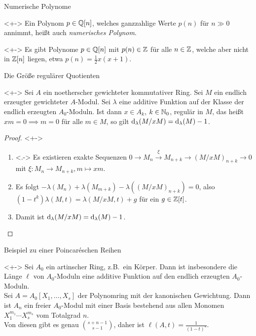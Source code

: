 \begin{frame}{Numerische Polynome}
	\begin{remark}<+->
		Ein Polynom \(p \in \mathbb Q[n]\), welches ganzzahlige Werte \(p(n)\) für
		\(n \gg 0\) annimmt, heißt auch \emph{numerisches Polynom}.
	\end{remark}
	\begin{example}<+->
		Es gibt Polynome \(p \in \mathbb Q[n]\) mit \(p(n) \in \mathbb Z\) für alle
		\(n \in \mathbb Z\), welche aber nicht in \(\mathbb Z[n]\) liegen, etwa
		\(p(n) = \frac 1 2 x(x + 1)\).
	\end{example}
\end{frame}

\begin{frame}{Die Größe regulärer Quotienten}
	\begin{proposition}<+->
		Sei \(A\) ein noetherscher gewichteter kommutativer Ring. Sei
		\(M\) ein endlich erzeugter gewichteter \(A\)-Modul. Sei \(\lambda\) eine additive
		Funktion auf der Klasse der endlich erzeugten \(A_0\)-Moduln. Ist dann
		\(x \in A_k\), \(k \in \mathbb N_0\), regulär in \(M\), das heißt
		\(x m = 0 \implies m = 0\) für alle \(m \in M\), so gilt
		\(\operatorname{d}_\lambda(M/x M) = \operatorname{d}_\lambda(M) - 1\).
	\end{proposition}
	\begin{proof}<+->
		\begin{enumerate}[<+->]
		\item<.->
			Es existieren exakte Sequenzen \(0 \to M_n \xrightarrow{\xi} 
			M_{n + k} \to (M/x M)_{n + k} \to 0\) mit \(\xi\colon M_n \to M_{n + k},
			m \mapsto x m\).
		\item
			Es folgt \(- \lambda(M_n) + \lambda(M_{m + k}) - \lambda((M/xM)_{n + k}) = 0\),
			also \((1 - t^k) \lambda(M, t) = \lambda(M/xM, t) + g\) für ein \(g \in \mathbb Z[t]\).
		\item
			Damit ist \(\operatorname{d}_\lambda(M/x M) = \operatorname{d}_\lambda(M) - 1\).
			\qedhere
		\end{enumerate}
	\end{proof}
\end{frame}

\begin{frame}{Beispiel zu einer Poincaréschen Reihen}
	\begin{example}<+->
		Sei \(A_0\) ein artinscher Ring, z.B.\ ein Körper. Dann ist insbesondere die Länge \(\ell\) von
		\(A_0\)-Moduln eine additive Funktion auf den endlich erzeugten \(A_0\)-Moduln.
		\\
		Sei \(A = A_0 [X_1, \dotsc, X_s]\) der Polynomring mit der kanonischen Gewichtung.
		Dann ist \(A_n\) ein freier \(A_0\)-Modul mit einer Basis bestehend
		aus allen Monomen \(X_1^{m_1} \dotsm X_s^{m_s}\) vom Totalgrad \(n\).
		\\
		Von diesen gibt es genau \(\binom{s + n - 1}{s - 1}\), daher ist
		\(\ell(A, t) = \frac{1}{(1 - t)^s}\).
	\end{example}
\end{frame}

